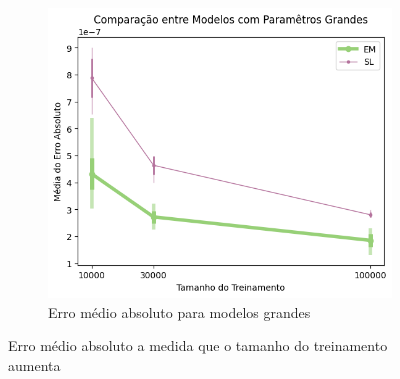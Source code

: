 \documentclass{subfiles}
\begin{document}
\begin{figure}
    \hfill
    \begin{subfigure}[b]{0.3\linewidth}
        \centering
        \includegraphics[width=\linewidth]{Figures/resultados/large_abs_prob_error}
        \caption{Erro médio absoluto para modelos grandes}
    \end{subfigure}
       \caption{Erro médio absoluto a medida que o tamanho do treinamento aumenta }
       \label{fig:abs_prob}
\end{figure}
\end{document}
